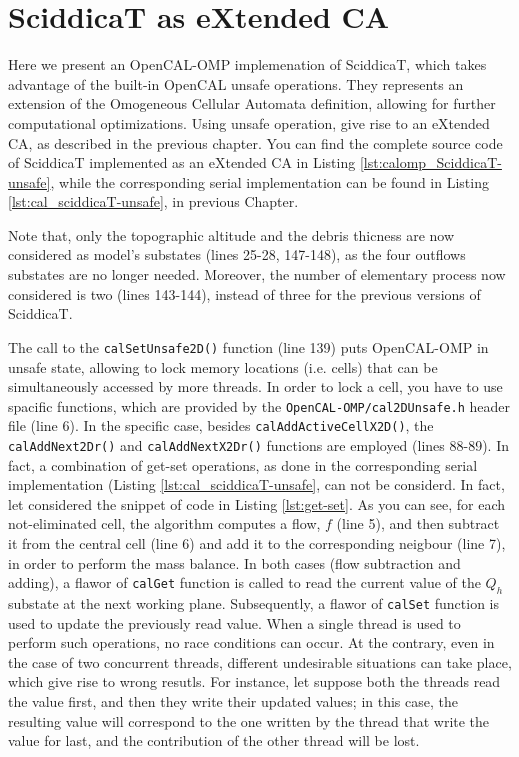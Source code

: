 \section{SciddicaT as eXtended CA}
Here we present an OpenCAL-OMP implemenation of SciddicaT, which takes
advantage of the built-in OpenCAL unsafe operations. They represents
an extension of the Omogeneous Cellular Automata definition, allowing
for further computational optimizations. Using unsafe operation, give
rise to an eXtended CA, as described in the previous chapter. You can
find the complete source code of SciddicaT implemented as an eXtended
CA in Listing \ref{lst:calomp_SciddicaT-unsafe}, while the
corresponding serial implementation can be found in Listing
\ref{lst:cal_sciddicaT-unsafe}, in previous Chapter.



Note that, only the topographic altitude and the debris thicness are
now considered as model's substates (lines 25-28, 147-148), as the
four outflows substates are no longer needed. Moreover, the number of
elementary process now considered is two (lines 143-144), instead of
three for the previous versions of SciddicaT.

The call to the \verb'calSetUnsafe2D()' function (line 139) puts
OpenCAL-OMP in unsafe state, allowing to lock memory locations
(i.e. cells) that can be simultaneously accessed by more threads. In
order to lock a cell, you have to use spacific functions, which are
provided by the \verb'OpenCAL-OMP/cal2DUnsafe.h' header file (line
6). In the specific case, besides \verb'calAddActiveCellX2D()', the
\verb'calAddNext2Dr()' and \verb'calAddNextX2Dr()' functions are
employed (lines 88-89). In fact, a combination of get-set operations,
as done in the corresponding serial implementation (Listing
\ref{lst:cal_sciddicaT-unsafe}, can not be considerd. In fact, let
considered the snippet of code in Listing \ref{lst:get-set}. As you
can see, for each not-eliminated cell, the algorithm computes a flow,
$f$ (line 5), and then subtract it from the central cell (line 6) and
add it to the corresponding neigbour (line 7), in order to perform the
mass balance. In both cases (flow subtraction and adding), a flawor of
\verb'calGet' function is called to read the current value of the
$Q_h$ substate at the next working plane. Subsequently, a flawor of
\verb'calSet' function is used to update the previously read
value. When a single thread is used to perform such operations, no
race conditions can occur. At the contrary, even in the case of two
concurrent threads, different undesirable situations can take place,
which give rise to wrong resutls. For instance, let suppose both the
threads read the value first, and then they write their updated values;
in this case, the resulting value will correspond to the one written
by the thread that write the value for last, and the contribution of
the other thread will be lost.

